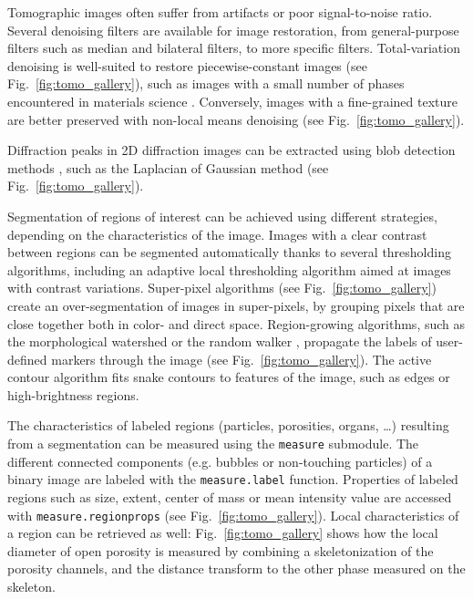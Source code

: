 \documentclass[twocolumn]{bmcart}%
\newcommand{\emma}[1]{{\color{blue}{#1}}}
\begin{document}
Tomographic images often suffer from artifacts or poor signal-to-noise
ratio. Several denoising filters are available for image restoration,
from general-purpose filters such as median and bilateral filters, to
more specific filters. Total-variation denoising \citep{Chambolle2004,
Getreuer2012} is well-suited to restore piecewise-constant images (see
Fig.~\ref{fig:tomo_gallery}), such as images with a small number of
phases encountered in materials science \citep{Bouttes2015}. Conversely,
images with a fine-grained texture are better preserved with non-local
means denoising \citep{Buades2005} (see Fig.~\ref{fig:tomo_gallery}).

\emma{Insert paragraph on features detection here? Juan?} Diffraction
peaks in 2D diffraction images can be extracted using blob detection
methods \citep{Ashiotis2015}, such as the Laplacian of Gaussian method
(see Fig.~\ref{fig:tomo_gallery}).

Segmentation of regions of interest can be achieved using different
strategies, depending on the characteristics of the image. Images with a
clear contrast between regions can be segmented automatically thanks to
several thresholding algorithms, including an adaptive local thresholding
algorithm aimed at images with contrast variations. Super-pixel
algorithms \citep{Felzenszwalb2004, Achanta2012} (see
Fig.~\ref{fig:tomo_gallery}) create an over-segmentation of images in
super-pixels, by grouping pixels that are close together both in color-
and direct space. Region-growing algorithms, such as the morphological
watershed or the random walker \citep{Grady2006}, propagate the labels
of user-defined markers through the image (see
Fig.~\ref{fig:tomo_gallery}). The active contour
algorithm \citep{Kass1988} fits snake contours to features of the
image, such as edges or high-brightness regions.

The characteristics of labeled regions (particles, porosities, organs,
\dots) resulting from a segmentation can be measured using the
\texttt{measure} submodule. The different connected components (e.g.
bubbles or non-touching particles) of a binary image are labeled with the
\texttt{measure.label} function. Properties of labeled regions such as
size, extent, center of mass or mean intensity value are accessed with
\texttt{measure.regionprops} (see Fig.~\ref{fig:tomo_gallery}). Local
characteristics of a region can be retrieved as well:
Fig.~\ref{fig:tomo_gallery} shows how the local diameter of open
porosity is measured by combining a skeletonization of the porosity
channels, and the distance transform to the other phase measured on the
skeleton.   
\end{document}
